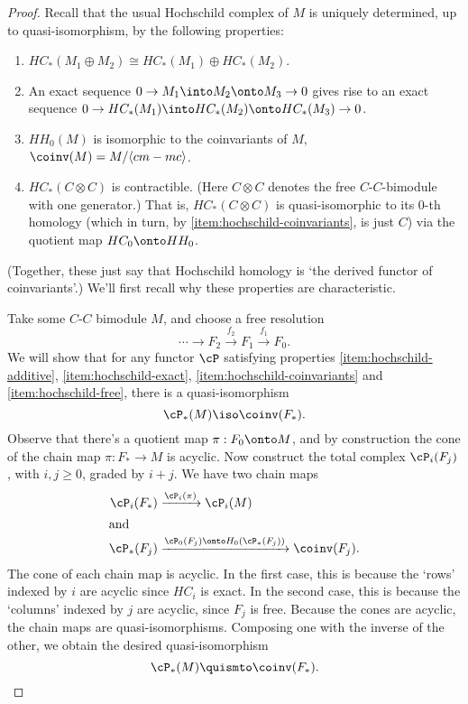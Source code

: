 \begin{proof}
Recall that the usual Hochschild complex of $M$ is uniquely determined,
up to quasi-isomorphism, by the following properties:
\begin{enumerate}
\item \label{item:hochschild-additive}%
$HC_*(M_1 \oplus M_2) \cong HC_*(M_1) \oplus HC_*(M_2)$.
\item \label{item:hochschild-exact}%
An exact sequence $0 \to M_1 \into M_2 \onto M_3 \to 0$ gives rise to an
exact sequence $0 \to HC_*(M_1) \into HC_*(M_2) \onto HC_*(M_3) \to 0$.
\item \label{item:hochschild-coinvariants}%
$HH_0(M)$ is isomorphic to the coinvariants of $M$, $\coinv(M) =
M/\langle cm-mc \rangle$.
\item \label{item:hochschild-free}%
$HC_*(C\otimes C)$ is contractible.
(Here $C\otimes C$ denotes
the free $C$-$C$-bimodule with one generator.)
That is, $HC_*(C\otimes C)$ is
quasi-isomorphic to its $0$-th homology (which in turn, by \ref{item:hochschild-coinvariants}, is just $C$) via the quotient map $HC_0 \onto HH_0$.
\end{enumerate}
(Together, these just say that Hochschild homology is `the derived functor of coinvariants'.)
We'll first recall why these properties are characteristic.

Take some $C$-$C$ bimodule $M$, and choose a free resolution
\begin{equation*}
\cdots \to F_2 \xrightarrow{f_2} F_1 \xrightarrow{f_1} F_0.
\end{equation*}
We will show that for any functor $\cP$ satisfying properties
\ref{item:hochschild-additive}, \ref{item:hochschild-exact},
\ref{item:hochschild-coinvariants} and \ref{item:hochschild-free}, there
is a quasi-isomorphism
$$\cP_*(M) \iso \coinv(F_*).$$
%
Observe that there's a quotient map $\pi: F_0 \onto M$, and by
construction the cone of the chain map $\pi: F_* \to M$ is acyclic. Now
construct the total complex $\cP_i(F_j)$, with $i,j \geq 0$, graded by
$i+j$. We have two chain maps
\begin{align*}
\cP_i(F_*) & \xrightarrow{\cP_i(\pi)} \cP_i(M) \\
\intertext{and}
\cP_*(F_j) & \xrightarrow{\cP_0(F_j) \onto H_0(\cP_*(F_j))} \coinv(F_j).
\end{align*}
The cone of each chain map is acyclic. In the first case, this is because the `rows' indexed by $i$ are acyclic since $HC_i$ is exact.
In the second case, this is because the `columns' indexed by $j$ are acyclic, since $F_j$ is free.
Because the cones are acyclic, the chain maps are quasi-isomorphisms. Composing one with the inverse of the other, we obtain the desired quasi-isomorphism
$$\cP_*(M) \quismto \coinv(F_*).$$


\end{proof}

